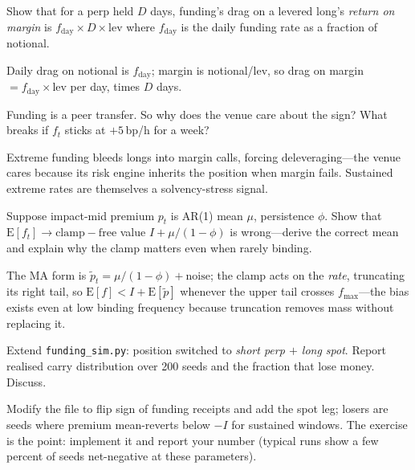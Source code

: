 \begin{exercise}
Show that for a perp held $D$ days, funding's drag on a levered long's \emph{return on margin}
is $f_{\mathrm{day}}\times D\times\mathrm{lev}$ where $f_{\mathrm{day}}$ is the daily funding
rate as a fraction of notional.
\end{exercise}
\begin{solution}
Daily drag on notional is $f_{\mathrm{day}}$; margin is notional/lev, so drag on margin
$=f_{\mathrm{day}}\times$lev per day, times $D$ days.
\end{solution}

\begin{exercise}
Funding is a peer transfer. So why does the venue care about the sign? What breaks if $f_t$
sticks at $+5$\,bp/h for a week?
\end{exercise}
\begin{solution}
Extreme funding bleeds longs into margin calls, forcing deleveraging---the venue cares because
its risk engine inherits the position when margin fails. Sustained extreme rates are
themselves a solvency-stress signal.
\end{solution}

\begin{exercise}[hard]
Suppose impact-mid premium $p_t$ is AR(1) mean $\mu$, persistence $\phi$. Show that
$\mathrm{E}[f_t] \to \mathrm{clamp-free}$ value $I+\mu/(1-\phi)$ is wrong---derive the correct
mean and explain why the clamp matters even when rarely binding.
\end{exercise}
\begin{solution}
The MA form is $\tilde p_t=\mu/(1-\phi)+\text{noise}$; the clamp acts on the \emph{rate},
truncating its right tail, so $\mathrm{E}[f] < I+\mathrm{E}[\tilde p]$ whenever the upper tail
crosses $f_{\max}$---the bias exists even at low binding frequency because truncation removes
mass without replacing it.
\end{solution}

\begin{exercise}[hard]
Extend \texttt{funding\_sim.py}: position switched to \emph{short perp $+$ long spot}. Report
realised carry distribution over 200 seeds and the fraction that lose money. Discuss.
\end{exercise}
\begin{solution}
Modify the file to flip sign of funding receipts and add the spot leg; losers are seeds where
premium mean-reverts below $-I$ for sustained windows. The exercise is the point: implement it
and report your number (typical runs show a few percent of seeds net-negative at these
parameters).
\end{solution}

